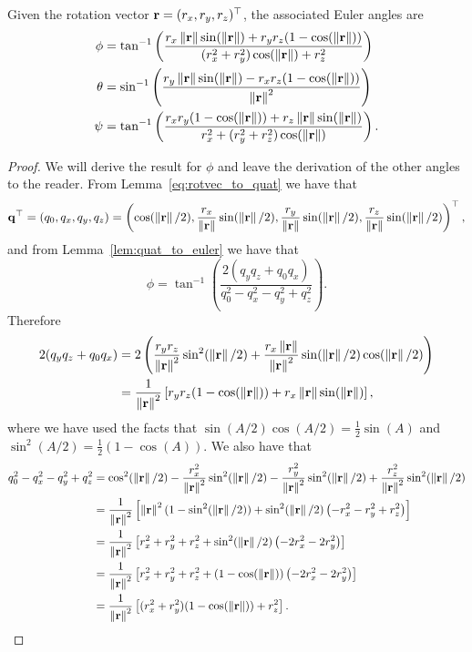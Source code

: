 \begin{lemma} \label{lem:rotvect_to_euler}
Given the rotation vector $\mathbf{r}=(r_x, r_y, r_z)^\top$, the associated Euler angles are
\begin{align*}
	\phi &= \tan^{-1}\left(\frac{r_x\left\|\mathbf{r}\right\|\sin(\left\|\mathbf{r}\right\|)+r_yr_z(1-\cos(\left\|\mathbf{r}\right\|))}{(r_x^2+r_y^2)\cos(\left\|\mathbf{r}\right\|)+r_z^2}\right) \\
	\theta &= \sin^{-1}\left(\frac{r_y\left\|\mathbf{r}\right\|\sin(\left\|\mathbf{r}\right\|)-r_xr_z(1-\cos(\left\|\mathbf{r}\right\|))}{\left\|\mathbf{r}\right\|^2}\right) \\
	\psi &= \tan^{-1}\left(\frac{r_xr_y(1-\cos(\left\|\mathbf{r}\right\|)) + r_z\left\|\mathbf{r}\right\|\sin(\left\|\mathbf{r}\right\|)}{r_x^2 + (r_y^2+r_z^2)\cos(\left\|\mathbf{r}\right\|)}\right).
\end{align*}
\end{lemma}
\begin{proof}
We will derive the result for $\phi$ and leave the derivation of the other angles to the reader.
From Lemma~\ref{eq:rotvec_to_quat} we have that
\[
\mathbf{q}^\top = (q_0, q_x, q_y, q_z) = \left(\cos(\left\|\mathbf{r}\right\|/2), \frac{r_x}{\left\|\mathbf{r}\right\|} \sin(\left\|\mathbf{r}\right\|/2), \frac{r_y}{\left\|\mathbf{r}\right\|} \sin(\left\|\mathbf{r}\right\|/2), \frac{r_z}{\left\|\mathbf{r}\right\|} \sin(\left\|\mathbf{r}\right\|/2)\right)^\top,
\]
and from Lemma~\ref{lem:quat_to_euler} we have that
\[
\phi = \tan^{-1}\left(\frac{2(q_y q_z+q_0q_x)}{q_0^2-q_x^2-q_y^2+q_z^2}\right).
\]
Therefore
\begin{align*}
	2(q_yq_z+q_0q_x) &= 2\left( \frac{r_yr_z}{\left\|\mathbf{r}\right\|^2}\sin^2(\left\|\mathbf{r}\right\|/2) + \frac{r_x\left\|\mathbf{r}\right\|}{\left\|\mathbf{r}\right\|^2} \sin(\left\|\mathbf{r}\right\|/2)\cos(\left\|\mathbf{r}\right\|/2)  \right) \\ 
	&= \frac{1}{\left\|\mathbf{r}\right\|^2}\left[r_yr_z(1-\cos(\left\|\mathbf{r}\right\|)) + r_x\left\|\mathbf{r}\right\| \sin(\left\|\mathbf{r}\right\|)\right],
\end{align*}
where we have used the facts that $\sin(A/2)\cos(A/2) = \frac{1}{2}\sin(A)$ and $\sin^2(A/2)=\frac{1}{2}(1-\cos(A))$.  We also have that
\begin{align*}
	q_0^2-q_x^2-q_y^2+q_z^2 &= \cos^2(\left\|\mathbf{r}\right\|/2) - \frac{r_x^2}{\left\|\mathbf{r}\right\|^2} \sin^2(\left\|\mathbf{r}\right\|/2) - \frac{r_y^2}{\left\|\mathbf{r}\right\|^2} \sin^2(\left\|\mathbf{r}\right\|/2) + \frac{r_z^2}{\left\|\mathbf{r}\right\|^2} \sin^2(\left\|\mathbf{r}\right\|/2) \\
	&= \frac{1}{\left\|\mathbf{r}\right\|^2}\left[ \left\|\mathbf{r}\right\|^2(1-\sin^2(\left\|\mathbf{r}\right\|/2)) + \sin^2(\left\|\mathbf{r}\right\|/2) \left(-r_x^2-r_y^2+r_z^2\right) \right] \\
	&= \frac{1}{\left\|\mathbf{r}\right\|^2}\left[r_x^2+r_y^2+r_z^2 + \sin^2(\left\|\mathbf{r}\right\|/2) \left(-2r_x^2-2r_y^2\right) \right] \\	
	&= \frac{1}{\left\|\mathbf{r}\right\|^2}\left[r_x^2+r_y^2+r_z^2 + (1-\cos(\left\|\mathbf{r}\right\|)) \left(-2r_x^2-2r_y^2\right) \right] \\	
	&= \frac{1}{\left\|\mathbf{r}\right\|^2}\left[(r_x^2+r_y^2)(1-\cos(\left\|\mathbf{r}\right\|)) + r_z^2 \right].
\end{align*}
\end{proof}


